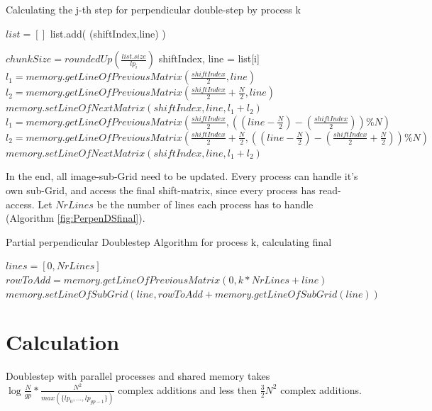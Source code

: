 \documentclass[12pt]{article}
\begin{document}
\begin{algorithm}
\caption{Calculating the j-th step for perpendicular double-step by process k}\label{euclid}
\label{fig:PerpenDS}
\begin{algorithmic}[1]
\State $list = []$
          list.add( (shiftIndex,line) )
     \EndFor
\EndFor

\State $chunkSize = roundedUp( \frac{list.size}{lp_i} )$
     \State shiftIndex, line = list[i]
          \State $l_1 = memory.getLineOfPreviousMatrix( \frac{shiftIndex}{2}, line )$
          \State $l_2 = memory.getLineOfPreviousMatrix( \frac{shiftIndex}{2}+\frac{N}{2},line )$
          \State $memory.setLineOfNextMatrix(shiftIndex, line, l_1+l_2)$
      \Else
          \State $l_1 = memory.getLineOfPreviousMatrix( \frac{shiftIndex}{2}, ((line-\frac{N}{2})-(\frac{shiftIndex}{2}))\%N )$
          \State $l_2 = memory.getLineOfPreviousMatrix( \frac{shiftIndex}{2}+\frac{N}{2},((line-\frac{N}{2})-(\frac{shiftIndex}{2}+\frac{N}{2}))\%N)$
          \State $memory.setLineOfNextMatrix(shiftIndex, line, l_1+l_2)$      
      \EndIf
\EndFor
\end{algorithmic}
\end{algorithm}


In the end, all image-sub-Grid need to be updated. Every process can handle it's own sub-Grid, and access the final shift-matrix, since every process has read-access. Let $NrLines$ be the number of lines each process has to handle (Algorithm \ref{fig:PerpenDSfinal}). 

\begin{algorithm}
\caption{Partial perpendicular Doublestep Algorithm for process k, calculating final}\label{euclid}
\label{fig:PerpenDSfinal}
\begin{algorithmic}[1]
\State $lines = [0 ,NrLines]$
      \State $rowToAdd = memory.getLineOfPreviousMatrix(0, k*NrLines+line)$
      \State $memory.setLineOfSubGrid(line, rowToAdd + memory.getLineOfSubGrid(line) )$
\EndFor
\end{algorithmic}
\end{algorithm}

\section{ Calculation }

Doublestep with parallel processes and shared memory takes $\log{\frac{N}{gp}}*\frac{N^2}{max(\{lp_0,...,lp_{gp-1}\})}$ complex additions and less then $\frac{3}{2}N^2$ complex additions.
\end{document}
